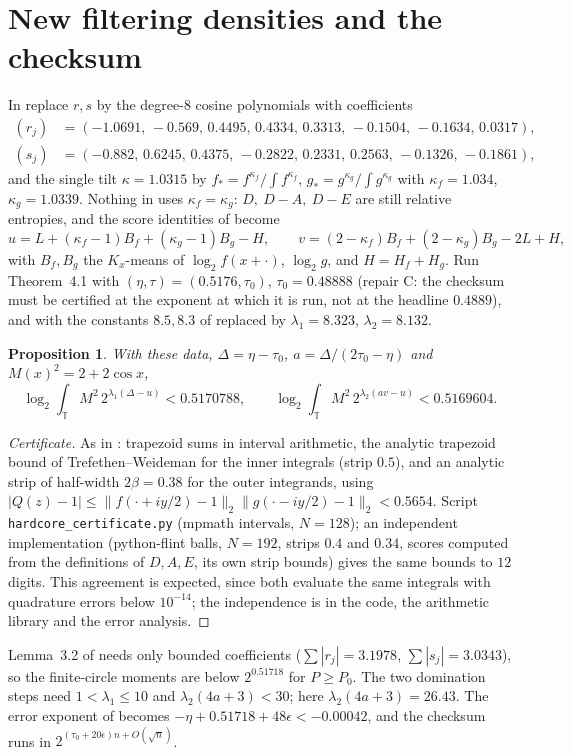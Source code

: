 \documentclass[11pt]{amsart}
\newtheorem{proposition}[theorem]{Proposition}
\theoremstyle{remark}
\newcommand{\eps}{\epsilon}
\begin{document}
\section{New filtering densities and the checksum}\label{sec:checksum}
In \cite[Section~3]{oai} replace $r,s$ by the degree-$8$ cosine polynomials with coefficients
\begin{align*}
(r_j)&=(-1.0691,\,-0.569,\,0.4495,\,0.4334,\,0.3313,\,-0.1504,\,-0.1634,\,0.0317),\\
(s_j)&=(-0.882,\,0.6245,\,0.4375,\,-0.2822,\,0.2331,\,0.2563,\,-0.1326,\,-0.1861),
\end{align*}
and the single tilt $\kappa=1.0315$ by $f_*=f^{\kappa_f}/\!\int f^{\kappa_f}$, $g_*=g^{\kappa_g}/\!\int g^{\kappa_g}$
with $\kappa_f=1.034$, $\kappa_g=1.0339$. Nothing in \cite[Sections~3--4]{oai} uses $\kappa_f=\kappa_g$:
$D,\ D-A,\ D-E$ are still relative entropies, and the score identities of \cite[Appendix~A]{oai} become
\[
u=L+(\kappa_f-1)B_f+(\kappa_g-1)B_g-H,\qquad v=(2-\kappa_f)B_f+(2-\kappa_g)B_g-2L+H,
\]
with $B_f,B_g$ the $K_x$-means of $\log_2f(x+\cdot)$, $\log_2g$, and $H=H_f+H_g$. Run
Theorem~4.1 with $(\eta,\tau)=(0.5176,\tau_0)$, $\tau_0=0.48888$ (repair C: the checksum must be
certified at the exponent at which it is run, not at the headline $0.4889$), and with the constants
$8.5,8.3$ of \cite[(3.6), (4.22)--(4.24)]{oai} replaced by $\lambda_1=8.323$, $\lambda_2=8.132$.

\begin{proposition}\label{prop:moments}
With these data, $\Delta=\eta-\tau_0$, $a=\Delta/(2\tau_0-\eta)$ and $M(x)^2=2+2\cos x$,
\[
\log_2\!\int_{\mathbb T}M^2\,2^{\lambda_1(\Delta-u)}<0.5170788,\qquad
\log_2\!\int_{\mathbb T}M^2\,2^{\lambda_2(av-u)}<0.5169604 .
\]
\end{proposition}
\begin{proof}[Certificate]
As in \cite[Appendix~A]{oai}: trapezoid sums in interval arithmetic, the analytic trapezoid bound of
Trefethen--Weideman \cite{tw} for the inner integrals (strip $0.5$), and an analytic strip of half-width
$2\beta=0.38$ for the outer integrands, using
$|Q(z)-1|\le\|f(\cdot+iy/2)-1\|_2\|g(\cdot-iy/2)-1\|_2<0.5654$. Script
\texttt{hardcore\_certificate.py} (mpmath intervals, $N=128$); an independent implementation
(python-flint balls, $N=192$, strips $0.4$ and $0.34$, scores computed from the definitions of $D,A,E$,
its own strip bounds) gives the same bounds to $12$ digits. This agreement is expected, since both
evaluate the same integrals with quadrature errors below $10^{-14}$; the independence is in the
code, the arithmetic library and the error analysis.
\end{proof}
Lemma~3.2 of \cite{oai} needs only bounded coefficients ($\sum|r_j|=3.1978$, $\sum|s_j|=3.0343$), so
the finite-circle moments are below $2^{0.51718}$ for $P\ge P_0$. The two domination steps
\cite[(4.22)--(4.23)]{oai} need $1<\lambda_1\le10$ and $\lambda_2(4a+3)<30$; here
$\lambda_2(4a+3)=26.43$. The error exponent of \cite[(4.25)]{oai} becomes
$-\eta+0.51718+48\eps<-0.00042$, and the checksum runs in $2^{(\tau_0+20\eps)n+O(\sqrt n)}$.
\end{document}
